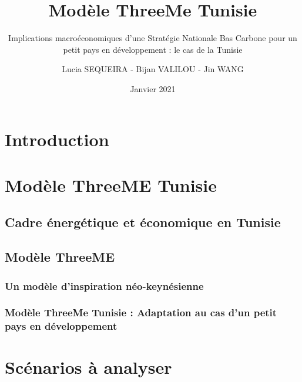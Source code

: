 \documentclass[
]{article}
\title{Modèle ThreeMe Tunisie}
\subtitle{Implications macroéconomiques d'une Stratégie Nationale Bas
Carbone pour un petit pays en développement : le cas de la Tunisie}
\author{Lucia SEQUEIRA - Bijan VALILOU - Jin WANG}
\date{Janvier 2021}
\begin{document}
\maketitle

{
\setcounter{tocdepth}{2}
\tableofcontents
}
\newpage

\hypertarget{introduction}{%
\section{Introduction}\label{introduction}}

\hypertarget{moduxe8le-threeme-tunisie}{%
\section{Modèle ThreeME Tunisie}\label{moduxe8le-threeme-tunisie}}

\hypertarget{cadre-uxe9nerguxe9tique-et-uxe9conomique-en-tunisie}{%
\subsection{Cadre énergétique et économique en
Tunisie}\label{cadre-uxe9nerguxe9tique-et-uxe9conomique-en-tunisie}}

\hypertarget{moduxe8le-threeme}{%
\subsection{Modèle ThreeME}\label{moduxe8le-threeme}}

\hypertarget{un-moduxe8le-dinspiration-nuxe9o-keynuxe9sienne}{%
\subsubsection{Un modèle d'inspiration
néo-keynésienne}\label{un-moduxe8le-dinspiration-nuxe9o-keynuxe9sienne}}

\hypertarget{moduxe8le-threeme-tunisie-adaptation-au-cas-dun-petit-pays-en-duxe9veloppement}{%
\subsubsection{Modèle ThreeMe Tunisie : Adaptation au cas d'un petit
pays en
développement}\label{moduxe8le-threeme-tunisie-adaptation-au-cas-dun-petit-pays-en-duxe9veloppement}}

\hypertarget{scuxe9narios-uxe0-analyser}{%
\section{Scénarios à analyser}\label{scuxe9narios-uxe0-analyser}}
\end{document}
